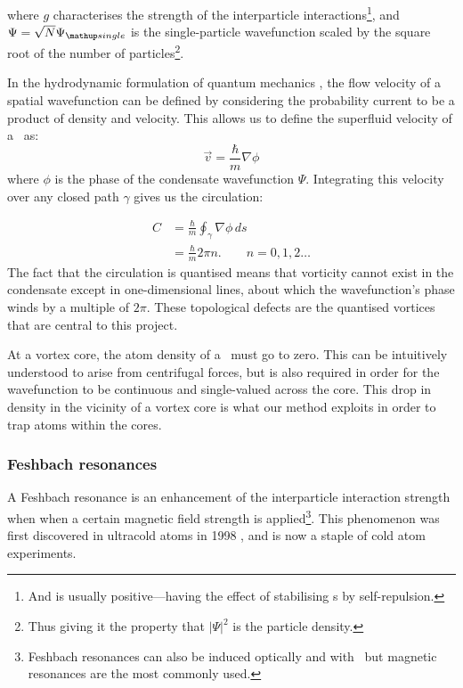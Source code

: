 where $g$ characterises the strength of the interparticle interactions\footnote{And is usually positive---having the effect of stabilising \bec s by self-repulsion.}, and $\Psi = \sqrt{N}\Psi_\up{single}$ is the single-particle wavefunction scaled by the square root of the number of particles\footnote{Thus giving it the property that $|\Psi|^2$ is the particle density.}.

In the hydrodynamic formulation of quantum mechanics \cite{madelung_quantentheorie_1927}, the flow velocity of a spatial wavefunction can be defined by considering the probability current to be a product of density and velocity. This allows us to define the superfluid velocity of a \bec\ as:
\begin{equation}
\vec v = \frac\hbar m \nabla\phi
\end{equation}
where $\phi$ is the phase of the condensate wavefunction $\Psi$. Integrating this velocity over any closed path $\gamma$ gives us the circulation:

\begin{align}
C &= \frac\hbar m\oint_\gamma\nabla\phi\,ds\\
  &= \frac\hbar m 2\pi n.\qquad n=0,1,2\dots
\end{align}
The fact that the circulation is quantised means that vorticity cannot exist in the condensate except in one-dimensional lines, about which the wavefunction's phase winds by a multiple of $2\pi$. These topological defects are the quantised vortices that are central to this project.

At a vortex core, the atom density of a \bec\ must go to zero. This can be intuitively understood to arise from centrifugal forces, but is also required in order for the wavefunction to be continuous and single-valued across the core. This drop in density in the vicinity of a vortex core is what our method exploits in order to trap atoms within the cores.

\subsubsection{Feshbach resonances}

A Feshbach resonance \cite{chin_feshbach_2010} is an enhancement of the interparticle interaction strength when when a certain magnetic field strength is applied\footnote{Feshbach resonances can also be induced optically and with \rf\, but magnetic resonances are the most commonly used.}. This phenomenon was first discovered in ultracold atoms in 1998 \cite{inouye_observation_1998}, and is now a staple of cold atom experiments.

